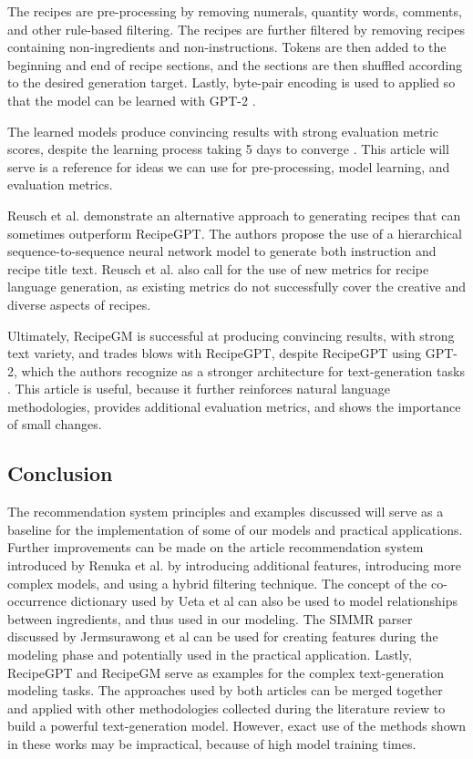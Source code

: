\documentclass[sigconf]{acmart}
\begin{document}
The recipes are pre-processing by removing numerals, quantity words, comments, and other rule-based filtering. The recipes are further filtered by removing recipes containing non-ingredients and non-instructions. Tokens are then added to the beginning and end of recipe sections, and the sections are then shuffled according to the desired generation target. Lastly, byte-pair encoding is used to applied so that the model can be learned with GPT-2 \cite{NLPRecipeGPT}.

The learned models produce convincing results with strong evaluation metric scores, despite the learning process taking 5 days to converge \cite{NLPRecipeGPT}. This article will serve is a reference for ideas we can use for pre-processing, model learning, and evaluation metrics.

Reusch et al. \cite{NLPRecipeGM} demonstrate an alternative approach to generating recipes that can sometimes outperform RecipeGPT. The authors propose the use of a hierarchical sequence-to-sequence neural network model to generate both instruction and recipe title text. Reusch et al. also call for the use of new metrics for recipe language generation, as existing metrics do not successfully cover the creative and diverse aspects of recipes.

Ultimately, RecipeGM is successful at producing convincing results, with strong text variety, and trades blows with RecipeGPT, despite RecipeGPT using GPT-2, which the authors recognize as a stronger architecture for text-generation tasks \cite{NLPRecipeGM}. This article is useful, because it further reinforces natural language methodologies, provides additional evaluation metrics, and shows the importance of small changes.

\subsection{Conclusion}
The recommendation system principles and examples discussed will serve as a baseline for the implementation of some of our models and practical applications. Further improvements can be made on the article recommendation system introduced by Renuka et al. \cite{RSArticle} by introducing additional features, introducing more complex models, and using a hybrid filtering technique. The concept of the co-occurrence dictionary used by Ueta et al \cite{RSRecipe} can also be used to model relationships between ingredients, and thus used in our modeling. The SIMMR parser discussed by Jermsurawong et al \cite{NLPSIMMR} can be used for creating features during the modeling phase and potentially used in the practical application. Lastly, RecipeGPT \cite{NLPRecipeGPT} and RecipeGM \cite{NLPRecipeGM} serve as examples for the complex text-generation modeling tasks. The approaches used by both articles can be merged together and applied with other methodologies collected during the literature review to build a powerful text-generation model. However, exact use of the methods shown in these works may be impractical, because of high model training times.
\end{document}
